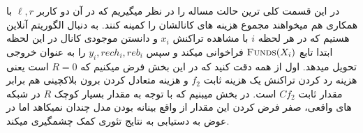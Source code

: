 


در این قسمت کلی ترین حالت مساله را در نظر میگیریم که در آن دو کاربر 
$\ell , r$
با همکاری هم میخواهند مجموع هزینه های کانالشان را کمینه کنند. به دنبال الگوریتم آنلاین \con هستیم که در هر لحظه $i$ با مشاهده تراکنش
$x_i$
و دانستن موجودی کانال در این لحظه ابتدا تابع 
$\Call{Funds}{X_i}$ 
فراخوانی میکند و سپس 
$y_i, rech_i , reb_i$
را به عنوان خروجی تحویل میدهد.
 اول از همه دقت کنید که در این بخش فرض میکنیم که 
$R=0$
 است یعنی هزینه رد کردن تراکنش یک هزینه ثابت 
$f_2$
 و هزینه متعادل کردن برون بلاکچینی هم برابر مقدار ثابت
$Cf_2$
است. در بخش   میبنیم که با توجه به مقدار بسیار کوچک
$R$
در شبکه های واقعی، صفر فرض کردن این مقدار از واقع بینانه بودن مدل چندان نمیکاهد اما در عوض به دستیابی به نتایج تئوری کمک چشمگیری میکند.

